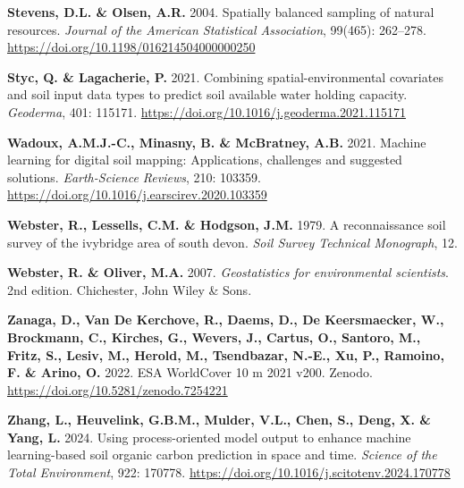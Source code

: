 \documentclass[
  10pt,
  b5paper,
  oneside]{book}
\newlength{\cslhangindent}
\newenvironment{CSLReferences}[2] %
 {\begin{list}{}{%
  \setlength{\itemindent}{0pt}
  \setlength{\leftmargin}{0pt}
  \setlength{\parsep}{0pt}
  \ifodd #1
   \setlength{\leftmargin}{\cslhangindent}
   \setlength{\itemindent}{-1\cslhangindent}
  \fi
  \setlength{\itemsep}{#2\baselineskip}}}
 {\end{list}}
\begin{document}
\begin{CSLReferences}{0}{0}
\textbf{Stevens, D.L. \& Olsen, A.R.} 2004. Spatially balanced sampling of natural resources. \emph{Journal of the American Statistical Association}, 99(465): 262--278. \url{https://doi.org/10.1198/016214504000000250}

\textbf{Styc, Q. \& Lagacherie, P.} 2021. Combining spatial-environmental covariates and soil input data types to predict soil available water holding capacity. \emph{Geoderma}, 401: 115171. \url{https://doi.org/10.1016/j.geoderma.2021.115171}

\textbf{Wadoux, A.M.J.-C., Minasny, B. \& McBratney, A.B.} 2021. Machine learning for digital soil mapping: Applications, challenges and suggested solutions. \emph{Earth-Science Reviews}, 210: 103359. \url{https://doi.org/10.1016/j.earscirev.2020.103359}

\textbf{Webster, R., Lessells, C.M. \& Hodgson, J.M.} 1979. A reconnaissance soil survey of the ivybridge area of south devon. \emph{Soil Survey Technical Monograph}, 12.

\textbf{Webster, R. \& Oliver, M.A.} 2007. \emph{Geostatistics for environmental scientists}. 2nd edition. Chichester, John Wiley \& Sons.

\textbf{Zanaga, D., Van De Kerchove, R., Daems, D., De Keersmaecker, W., Brockmann, C., Kirches, G., Wevers, J., Cartus, O., Santoro, M., Fritz, S., Lesiv, M., Herold, M., Tsendbazar, N.-E., Xu, P., Ramoino, F. \& Arino, O.} 2022. ESA WorldCover 10 m 2021 v200. Zenodo. \url{https://doi.org/10.5281/zenodo.7254221}

\textbf{Zhang, L., Heuvelink, G.B.M., Mulder, V.L., Chen, S., Deng, X. \& Yang, L.} 2024. Using process-oriented model output to enhance machine learning-based soil organic carbon prediction in space and time. \emph{Science of the Total Environment}, 922: 170778. \url{https://doi.org/10.1016/j.scitotenv.2024.170778}

\end{CSLReferences}


\end{document}
